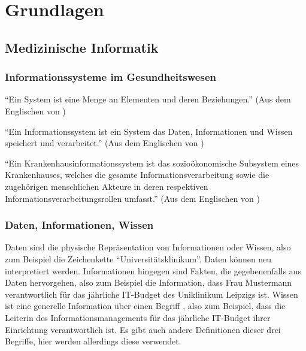 \chapter{Grundlagen}\label{ch:preliminaries}

\section{Medizinische Informatik}

\subsection{Informationssysteme im Gesundheitswesen}

\begin{definition}[System]
\enquote{Ein System ist eine Menge an Elementen und deren Beziehungen.}
(Aus dem Englischen von \citet[S.~30]{bb})
\end{definition}
\begin{definition}[Informationssystem]
\enquote{Ein Informationssystem ist ein System das Daten, Informationen und Wissen speichert und verarbeitet.}
(Aus dem Englischen von \citet[S.~30]{bb})
\end{definition}

\begin{definition}
\enquote{Ein Krankenhausinformationssystem ist das sozioökonomische Subsystem eines Krankenhauses, welches die gesamte Informationsverarbeitung sowie die zugehörigen menschlichen Akteure in deren respektiven Informationsverarbeitungsrollen umfasst.}
(Aus dem Englischen von \citet[S.~37]{bb})
\end{definition}

\subsection{Daten, Informationen, Wissen}
Daten sind die physische Repräsentation von Informationen oder Wissen, also zum Beispiel die Zeichenkette \enquote{Universitätsklinikum}.
Daten können neu interpretiert werden.
Informationen hingegen sind Fakten, die gegebenenfalls aus Daten hervorgehen, also zum Beispiel die Information, dass Frau Mustermann verantwortlich für das jährliche IT-Budget des Uniklinikum Leipzigs ist.
Wissen ist eine generelle Information über einen Begriff \citep[S.~29]{bb}, also zum Beispiel, dass die Leiterin des Informationsmanagements für das jährliche IT-Budget ihrer Einrichtung verantwortlich ist.
Es gibt auch andere Definitionen dieser drei Begriffe, hier werden allerdings diese verwendet.

